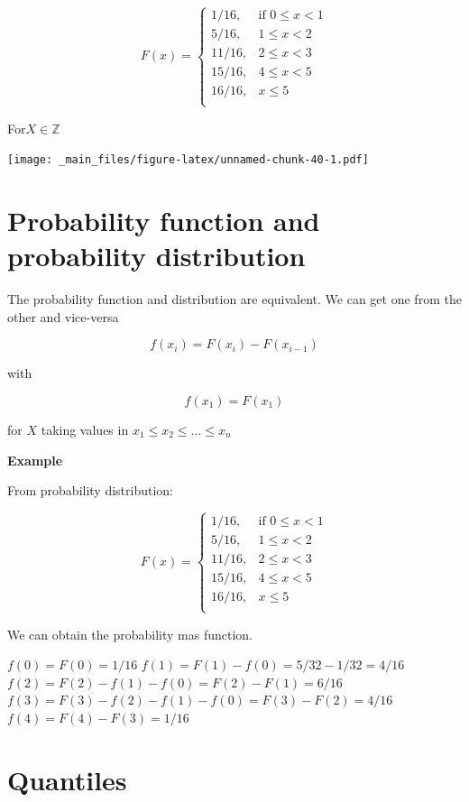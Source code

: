 \documentclass[
]{book}
\begin{document}
\[
    F(x)=
\begin{cases}
    1/16,& \text{if } 0 \leq x < 1\\
    5/16,& 1\leq x < 2\\
    11/16,& 2\leq x < 3\\
    15/16,& 4\leq x < 5\\
    16/16,&  x \leq 5\\
\end{cases}
\]

For\(X \in \mathbb{Z}\)

\texttt{[image: \_main\_files/figure-latex/unnamed-chunk-40-1.pdf]}

\hypertarget{probability-function-and-probability-distribution}{%
\section{Probability function and probability distribution}\label{probability-function-and-probability-distribution}}

The probability function and distribution are equivalent. We can get one from the other and vice-versa

\[f(x_i)=F(x_i)-F(x_{i-1})\]

with

\[f(x_1)=F(x_1)\]

for \(X\) taking values in \(x_1 \leq x_2 \leq ... \leq x_n\)

\textbf{Example}

From probability distribution:

\[
    F(x)=
\begin{cases}
    1/16,& \text{if } 0 \leq x < 1\\
    5/16,& 1\leq x < 2\\
    11/16,& 2\leq x < 3\\
    15/16,& 4\leq x < 5\\
    16/16,&  x \leq 5\\
\end{cases}
\]

We can obtain the probability mas function.

\(f(0)=F(0)=1/16\)
\(f(1)=F(1)-f(0)=5/32-1/32=4/16\)
\(f(2)=F(2)-f(1)-f(0)=F(2)-F(1)=6/16\)
\(f(3)=F(3)-f(2)-f(1)-f(0)=F(3)-F(2)=4/16\)
\(f(4)=F(4)-F(3)=1/16\)

\hypertarget{quantiles}{%
\section{Quantiles}\label{quantiles}}
\end{document}
